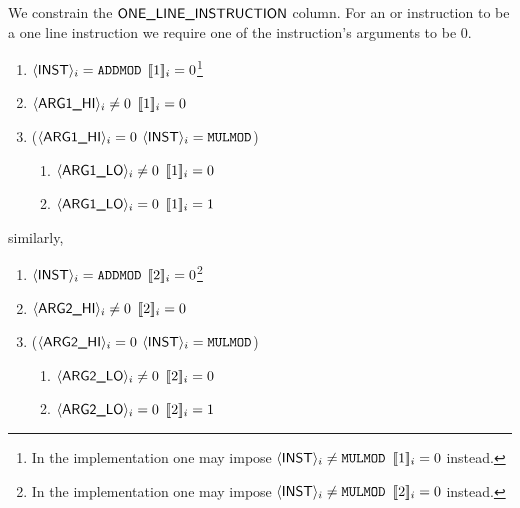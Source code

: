 We constrain the $\textsf{ONE\_LINE\_INSTRUCTION}{}$ column. For an  or  instruction to be a one line instruction we require one of the instruction's arguments to be 0.
\begin{center}
\end{center}
\begin{enumerate}
	\item \If $\langle{}\textsf{INST}\rangle{}_{i} = \texttt{ADDMOD}$ \Then $[\![1]\!]_{i} = 0$\footnote{In the implementation one may impose \If $\langle{}\textsf{INST}\rangle{}_{i} \neq \texttt{MULMOD}$ \Then $[\![1]\!]_{i} = 0$ instead.}
	\item \If $\langle{}\textsf{ARG}\textsf{1}\textsf{\_HI}\rangle{}_{i} \neq 0$ \Then $[\![1]\!]_{i} = 0$
	\item \If \Big($\langle{}\textsf{ARG}\textsf{1}\textsf{\_HI}\rangle{}_{i} = 0$ \et $\langle{}\textsf{INST}\rangle{}_{i} = \texttt{MULMOD}$\Big) \Then
	\begin{enumerate}
		\item \If $\langle{}\textsf{ARG}\textsf{1}\textsf{\_LO}\rangle{}_{i} \neq 0$ \Then $[\![1]\!]_{i} = 0$
		\item \If $\langle{}\textsf{ARG}\textsf{1}\textsf{\_LO}\rangle{}_{i} = 0$ 	 \Then $[\![1]\!]_{i} = 1$
	\end{enumerate}
\end{enumerate}
similarly, 
\begin{enumerate}
	\item \If $\langle{}\textsf{INST}\rangle{}_{i} = \texttt{ADDMOD}$ \Then $[\![2]\!]_{i} = 0$\footnote{In the implementation one may impose \If $\langle{}\textsf{INST}\rangle{}_{i} \neq \texttt{MULMOD}$ \Then $[\![2]\!]_{i} = 0$ instead.}
	\item \If $\langle{}\textsf{ARG}\textsf{2}\textsf{\_HI}\rangle{}_{i} \neq 0$ \Then $[\![2]\!]_{i} = 0$
	\item \If \Big($\langle{}\textsf{ARG}\textsf{2}\textsf{\_HI}\rangle{}_{i} = 0$ \et $\langle{}\textsf{INST}\rangle{}_{i} = \texttt{MULMOD}$\Big) \Then
	\begin{enumerate}
		\item \If $\langle{}\textsf{ARG}\textsf{2}\textsf{\_LO}\rangle{}_{i} \neq 0$ \Then $[\![2]\!]_{i} = 0$
		\item \If $\langle{}\textsf{ARG}\textsf{2}\textsf{\_LO}\rangle{}_{i} = 0$ \Then $[\![2]\!]_{i} = 1$
	\end{enumerate}
\end{enumerate}
